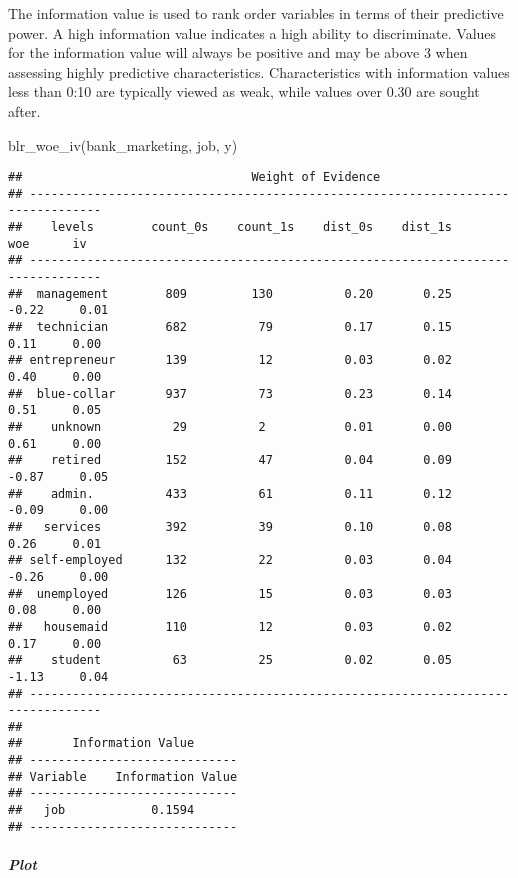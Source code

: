 \documentclass[
]{article}
\newenvironment{Shaded}{\begin{snugshade}}{\end{snugshade}}
\newcommand{\FunctionTok}[1]{\textcolor[rgb]{0.00,0.00,0.00}{#1}}
\newcommand{\NormalTok}[1]{#1}
\begin{document}
The information value is used to rank order variables in terms of their
predictive power. A high information value indicates a high ability to
discriminate. Values for the information value will always be positive
and may be above 3 when assessing highly predictive characteristics.
Characteristics with information values less than 0:10 are typically
viewed as weak, while values over 0.30 are sought after.

\begin{Shaded}
\begin{Highlighting}[]
\FunctionTok{blr\_woe\_iv}\NormalTok{(bank\_marketing, job, y)}
\end{Highlighting}
\end{Shaded}

\begin{verbatim}
##                                Weight of Evidence                                
## --------------------------------------------------------------------------------
##    levels        count_0s    count_1s    dist_0s    dist_1s        woe      iv   
## --------------------------------------------------------------------------------
##  management        809         130          0.20       0.25      -0.22     0.01  
##  technician        682          79          0.17       0.15       0.11     0.00  
## entrepreneur       139          12          0.03       0.02       0.40     0.00  
##  blue-collar       937          73          0.23       0.14       0.51     0.05  
##    unknown          29          2           0.01       0.00       0.61     0.00  
##    retired         152          47          0.04       0.09      -0.87     0.05  
##    admin.          433          61          0.11       0.12      -0.09     0.00  
##   services         392          39          0.10       0.08       0.26     0.01  
## self-employed      132          22          0.03       0.04      -0.26     0.00  
##  unemployed        126          15          0.03       0.03       0.08     0.00  
##   housemaid        110          12          0.03       0.02       0.17     0.00  
##    student          63          25          0.02       0.05      -1.13     0.04  
## --------------------------------------------------------------------------------
## 
##       Information Value       
## -----------------------------
## Variable    Information Value 
## -----------------------------
##   job            0.1594       
## -----------------------------
\end{verbatim}

\hypertarget{plot-8}{%
\subparagraph{Plot}\label{plot-8}}
\end{document}
